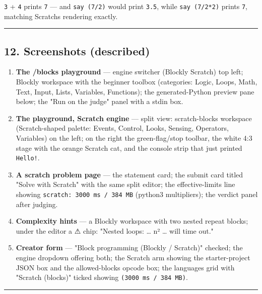 \documentclass[
]{article}
\providecommand{\tightlist}{%
  \setlength{\itemsep}{0pt}\setlength{\parskip}{0pt}}
\begin{document}
\texttt{3} + \texttt{4} prints \texttt{7} --- and \texttt{say\ (7/2)}
would print \texttt{3.5}, while \texttt{say\ (7/2*2)} prints \texttt{7},
matching Scratch\textquotesingle s rendering exactly.

\begin{center}\rule{0.5\linewidth}{0.5pt}\end{center}

\subsection{12. Screenshots (described)}\label{12-screenshots-described}

\begin{enumerate}
\def\labelenumi{\arabic{enumi}.}
\tightlist
\item
  \textbf{The /blocks playground} --- engine switcher (Blockly
  \textbar{} Scratch) top left; Blockly workspace with the beginner
  toolbox (categories: Logic, Loops, Math, Text, Input, Lists,
  Variables, Functions); the generated-Python preview pane below; the
  "Run on the judge" panel with a stdin box.
\item
  \textbf{The playground, Scratch engine} --- split view: scratch-blocks
  workspace (Scratch-shaped palette: Events, Control, Looks, Sensing,
  Operators, Variables) on the left; on the right the green-flag/stop
  toolbar, the white 4:3 stage with the orange Scratch cat, and the
  console strip that just printed \texttt{Hello!}.
\item
  \textbf{A scratch problem page} --- the statement card; the submit
  card titled "Solve with Scratch" with the same split editor; the
  effective-limits line showing \texttt{scratch:\ 3000\ ms\ /\ 384\ MB}
  (python3 multipliers); the verdict panel after judging.
\item
  \textbf{Complexity hints} --- a Blockly workspace with two nested
  repeat blocks; under the editor a ⚠ chip: "Nested loops: \ldots{} n²
  \ldots{} will time out."
\item
  \textbf{Creator form} --- "Block programming (Blockly / Scratch)"
  checked; the engine dropdown offering both; the Scratch arm showing
  the starter-project JSON box and the allowed-blocks opcode box; the
  languages grid with "Scratch (blocks)" ticked showing
  \texttt{(3000\ ms\ /\ 384\ MB)}.
\end{enumerate}

\begin{center}\rule{0.5\linewidth}{0.5pt}\end{center}
\end{document}
